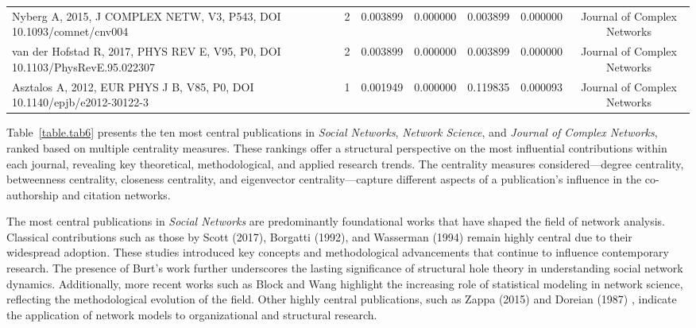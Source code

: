 \documentclass[twocolumn]{article}
\begin{document}
\begin{table}[htbp]
{\begin{tabular}{lcccccc}
					Nyberg A, 2015, J COMPLEX NETW, V3, P543, DOI 10.1093/comnet/cnv004 & 2 & 0.003899 & 0.000000 & 0.003899 & 0.000000 & Journal of Complex Networks \\
					van der Hofstad R, 2017, PHYS REV E, V95, P0, DOI 10.1103/PhysRevE.95.022307 & 2 & 0.003899 & 0.000000 & 0.003899 & 0.000000 & Journal of Complex Networks \\
					Asztalos A, 2012, EUR PHYS J B, V85, P0, DOI 10.1140/epjb/e2012-30122-3 & 1 & 0.001949 & 0.000000 & 0.119835 & 0.000093 & Journal of Complex Networks \\
					\bottomrule
				\end{tabular}
			}
		\end{table}
		
		Table~\ref{table.tab6} presents the ten most central publications in \textit{Social Networks}, \textit{Network Science}, and \textit{Journal of Complex Networks}, ranked based on multiple centrality measures. These rankings offer a structural perspective on the most influential contributions within each journal, revealing key theoretical, methodological, and applied research trends. The centrality measures considered—degree centrality, betweenness centrality, closeness centrality, and eigenvector centrality—capture different aspects of a publication’s influence in the co-authorship and citation networks.
		
		The most central publications in \textit{Social Networks} are predominantly foundational works that have shaped the field of network analysis. Classical contributions such as those by Scott (2017), Borgatti (1992), and Wasserman (1994) \cite{Scott2017,Borgatti1992,Wasserman1994} remain highly central due to their widespread adoption. These studies introduced key concepts and methodological advancements that continue to influence contemporary research. The presence of Burt's work \cite{Burt1983,Burt1992,Burt1992} further underscores the lasting significance of structural hole theory in understanding social network dynamics. Additionally, more recent works such as Block \cite{Block2015} and Wang \cite{Wang2013} highlight the increasing role of statistical modeling in network science, reflecting the methodological evolution of the field. Other highly central publications, such as Zappa (2015) \cite{Zappa2015} and Doreian (1987) \cite{Doreian1987}, indicate the application of network models to organizational and structural research.
		
\end{document}
